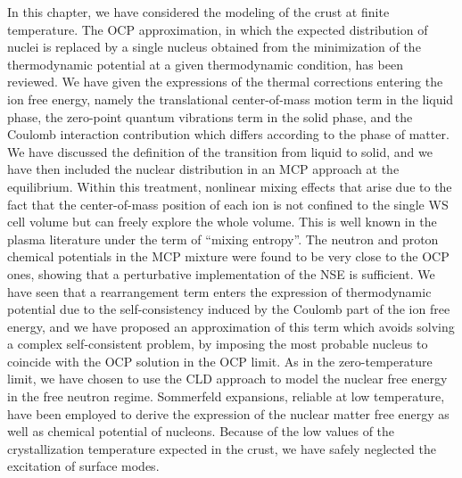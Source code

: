 In this chapter, we have considered the modeling of the crust at finite
temperature. 
The OCP approximation, in which the expected distribution of
nuclei is replaced by a single nucleus obtained from the minimization of the
thermodynamic potential at a given thermodynamic condition, has been reviewed.
We have given the expressions of the thermal corrections entering the ion 
free energy, namely the translational center-of-mass motion term in the liquid 
phase, the zero-point quantum vibrations term in the solid phase, and the 
Coulomb interaction contribution which differs according to the phase of 
matter. We have discussed the definition of the transition from liquid to
solid, and we have then included the nuclear distribution in an MCP approach at 
the equilibrium. 
Within this treatment, nonlinear mixing effects that arise due to 
the fact that the center-of-mass position of each ion is not confined to the 
single WS cell volume but can freely explore the whole volume. This is well
known in the plasma literature under the term of ``mixing entropy''.
The neutron and proton chemical potentials in the MCP mixture were found to be 
very close to the OCP ones, showing that a perturbative implementation of the 
NSE is sufficient. 
We have seen that a rearrangement term enters the expression of thermodynamic 
potential due to the self-consistency induced by the Coulomb part of the ion 
free energy, and we have proposed an approximation of this term which avoids
solving a complex self-consistent problem, by imposing the most 
probable nucleus to coincide with the OCP solution in the OCP limit.
As in the zero-temperature limit, we have chosen to use the CLD approach to 
model the nuclear free energy in the free neutron regime. 
Sommerfeld expansions, reliable at low temperature, have been employed to 
derive the expression of the nuclear matter free energy as well as chemical
potential of nucleons. Because of the low values of the crystallization 
temperature expected in the crust, we have safely neglected the excitation of 
surface modes.

